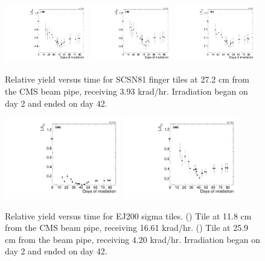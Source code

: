 \begin{figure}[tbp!]
\includegraphics[width=0.32\textwidth]{figures/SCSN81-F-27p2cm-f14ch2-time.pdf}
\includegraphics[width=0.32\textwidth]{figures/SCSN81-F-27p2cm-f14ch5-time.pdf}
\includegraphics[width=0.32\textwidth]{figures/SCSN81-F-27p2cm-f16ch0-time.pdf}
\caption{Relative yield versus time for SCSN81 finger tiles at 27.2 cm from the CMS beam pipe, receiving 3.93 krad/hr. Irradiation began on day 2 and ended on day 42.}
\label{fig:SCSN81-F-27p2cm-time}
\end{figure} 

\begin{figure}[tbp!]
\centering
\includegraphics[width=0.45\textwidth]{figures/EJ200-S-11p8cm-f18ch5-time.pdf}
\includegraphics[width=0.45\textwidth]{figures/EJ200-S-25p9cm-f15ch5-time.pdf}
\caption{Relative yield versus time for EJ200 sigma tiles. (\cmsLeft) Tile at 11.8 cm from the CMS beam pipe, receiving 16.61 krad/hr. (\cmsRight) Tile at 25.9 cm from the beam pipe, receiving 4.20 krad/hr. Irradiation began on day 2 and ended on day 42.}
\label{fig:EJ200-S-time}
\end{figure} 

